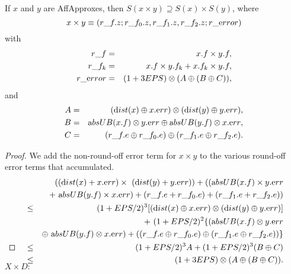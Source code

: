 \begin{proposition}\label{GMT prop8.6} If $x$ and $y$ are 
{\textrm AffApproxes,}
then $S(x \times y) \supseteq S(x) \times S(y)${\textrm ,} where
$$x \times y \equiv (r\_f.z; r\_f_0.z, r\_f_1.z, r\_f_2.z; r\_{\textrm error})$$
with
\begin{eqnarray*}
r\_f &=& x.f \times y.f,\\
r\_f_k &=& x.f \times y.f_k + x.f_k \times y.f,\\
r\_{\textrm error} &=& 
(1 + 3EPS) \otimes (A \oplus (B \oplus C)),\end{eqnarray*}
and
\begin{eqnarray*}
A &=& ({\textrm dist}(x) \oplus x.{\textrm err})\otimes ({\textrm dist}(y) \oplus y.{\textrm err}),
\\
B& =& {\textrm absUB}(x.f) \otimes
y.{\textrm err} \oplus {\textrm absUB}(y.f) \otimes x.{\textrm err},\\
C& =& (r\_f.e \oplus r\_f_0.e) \oplus (r\_f_1.e \oplus
r\_f_2.e).\end{eqnarray*}
\end{proposition}

\begin{proof}{}
We add the non-round-off error term for $x \times y$ to the various round-off error terms that accumulated.
\begin{eqnarray*}
&&\hskip-48pt (({\textrm dist}(x) + x.{\textrm err}) \times\ ({\textrm dist}(y) + y.{\textrm err})) +
 (({\textrm absUB}(x.f) \times y.{\textrm err} 
\\
&& +\ 
{\textrm absUB}(y.f) \times x.{\textrm err}) +
 (r\_f.e + r\_f_0.e) + (r\_f_1.e + r\_f_2.e))
\\
&\le& 
(1+EPS/2)^3[({\textrm dist}(x) \oplus x.{\textrm err})\otimes ({\textrm dist}(y) \oplus y.{\textrm err})]\\
&& +\
 (1+EPS/2)^2\{({\textrm absUB}(x.f) \otimes y.{\textrm err} 
\\
& &\oplus\ 
{\textrm absUB}(y.f) \otimes x.{\textrm err}) +
((r\_f.e \oplus r\_f_0.e) \oplus (r\_f_1.e \oplus r\_f_2.e))\}
\\
&\le& (1+EPS/2)^3 A + (1+EPS/2)^3 (B \oplus C) \\
&\le& (1+3EPS) \otimes (A \oplus (B \oplus C) ). \\
\noalign{\vskip-36pt}
\end{eqnarray*}
\end{proof}

$X \times D$: 

